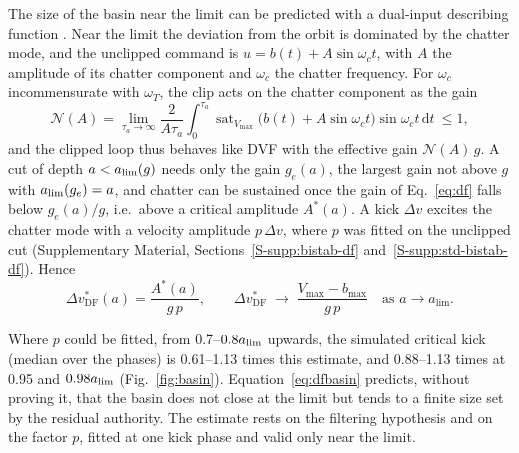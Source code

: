 The size of the basin near the limit can be predicted with a dual-input describing function \citep{gelb1968describing}. Near the limit the deviation from the orbit is dominated by the chatter mode, and the unclipped command is $u=b(t)+A\sin\omega_ct$, with $A$ the amplitude of its chatter component and $\omega_c$ the chatter frequency. For $\omega_c$ incommensurate with $\omega_T$, the clip acts on the chatter component as the gain
\begin{equation}\label{eq:df}
  \mathcal N(A)=\lim_{\tau_a\to\infty}\frac{2}{A\tau_a}\int_0^{\tau_a}\operatorname{sat}_{V_{\max}}\bigl(b(t)+A\sin\omega_ct\bigr)\sin\omega_ct\,\mathrm dt\ \le 1,
\end{equation}
and the clipped loop thus behaves like DVF with the effective gain $\mathcal N(A)\,g$. A cut of depth $a<a_{\lim}(g)$ needs only the gain $g_e(a)$, the largest gain not above $g$ with $a_{\lim}(g_e)=a$, and chatter can be sustained once the gain of Eq.~\eqref{eq:df} falls below $g_e(a)/g$, i.e.\ above a critical amplitude $A^*(a)$. A kick $\Delta v$ excites the chatter mode with a velocity amplitude $p\,\Delta v$, where $p$ was fitted on the unclipped cut (Supplementary Material, Sections~\ref{S-supp:bistab-df} and~\ref{S-supp:std-bistab-df}). Hence
\begin{equation}\label{eq:dfbasin}
  \Delta v^*_{\mathrm{DF}}(a)=\frac{A^*(a)}{g\,p},\qquad
  \Delta v^*_{\mathrm{DF}}\;\to\;\frac{V_{\max}-b_{\max}}{g\,p}\quad\text{as }a\to a_{\lim}.
\end{equation}

Where $p$ could be fitted, from 0.7--$0.8a_{\lim}$ upwards, the simulated critical kick (median over the phases) is 0.61--1.13 times this estimate, and 0.88--1.13 times at 0.95 and $0.98a_{\lim}$ (Fig.~\ref{fig:basin}). Equation~\eqref{eq:dfbasin} predicts, without proving it, that the basin does not close at the limit but tends to a finite size set by the residual authority. The estimate rests on the filtering hypothesis and on the factor $p$, fitted at one kick phase and valid only near the limit.
